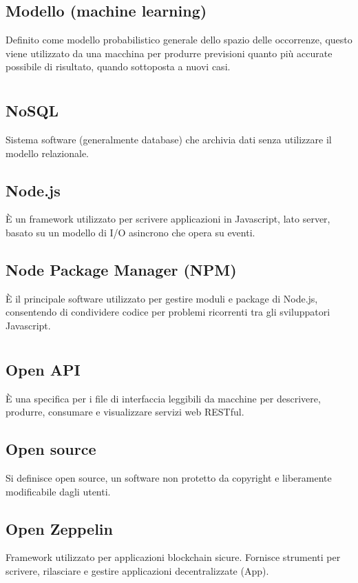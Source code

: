 	\subsection*{Modello (machine learning)}
	Definito come modello probabilistico generale dello spazio delle occorrenze, questo viene utilizzato da una macchina per produrre previsioni quanto più accurate possibile di risultato, quando sottoposta a nuovi casi.
\pagebreak
\section[N]{}
	\subsection*{NoSQL}
	Sistema software (generalmente database) che archivia dati senza utilizzare il modello relazionale.
	\subsection*{Node.js}
	È un framework utilizzato per scrivere applicazioni in Javascript, lato server, basato su un modello di I/O asincrono che opera su eventi.
	\subsection*{Node Package Manager (NPM)}
	È il principale software utilizzato per gestire moduli e package di Node.js, consentendo di condividere codice per problemi ricorrenti tra gli sviluppatori Javascript.
\pagebreak
\section[O]{}
	\subsection*{Open API}
	È una specifica per i file di interfaccia leggibili da macchine per descrivere, produrre, consumare e visualizzare servizi web RESTful.
	\subsection*{Open source}
	Si definisce open source, un software non protetto da copyright e liberamente modificabile dagli utenti.
	\subsection*{Open Zeppelin}
	Framework utilizzato per applicazioni blockchain sicure. Fornisce strumenti per scrivere, rilasciare e gestire applicazioni decentralizzate (\DJ{}App).
